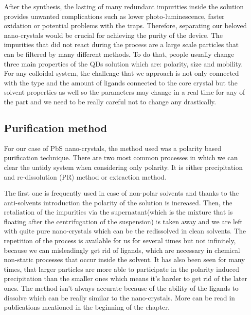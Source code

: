 After the synthesis, the lasting of many redundant impurities inside the solution provides unwanted complications such as lower photo-luminescence, faster oxidation or potential problems with the traps. Therefore, separating our beloved nano-crystals would be crucial for achieving the purity of the device. The  impurities that did not react during the process are a large scale particles that can be  filtered by many different methods. \cite{Shen2017}\cite{purif} To do that, people usually change three main properties of the QDs solution which are: polarity, size and mobility. For any colloidal system, the challenge that we approach is not only connected with the type and the amount of ligands connected to the core crystal but the solvent properties as well so the parameters may change in a real time for any of the part and we need to be really careful not to change any drastically. 

\subsection{Purification method}

For our case of PbS nano-crystals, the method used was a polarity based purification technique. There are two most common processes in which we can clear the untidy system when considering only polarity. It is either precipitation and re-dissolution (PR) method or extraction method. 

The first one is frequently used in case of non-polar solvents and thanks to the anti-solvents introduction the polarity of the solution is increased. Then, the retaliation of the impurities via the supernatant(which is the mixture that is floating after the centrifugation of the suspension) is taken away and we are left with quite pure nano-crystals which can be the redissolved in clean solvents. The repetition of the process is available for us for several times but not infinitely, because we can misleadingly get rid of ligands, which are necessary in chemical non-static processes that occur inside the solvent. It has also been seen for many times, that larger particles are more able to participate in the polarity induced precipitation than the smaller ones which means it's harder to get rid of the later ones. The method isn't always accurate because of the ability of the ligands to dissolve which can be really similar to the nano-crystals. More can be read in publications mentioned in the beginning of the chapter.
\vline

